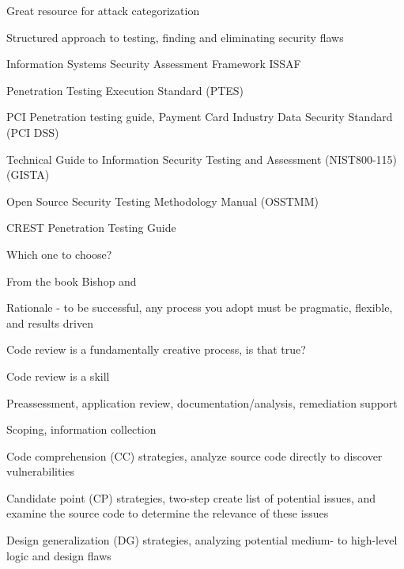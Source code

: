 \documentclass[Screen16to9,17pt]{foils}
\begin{document}

Great resource for attack categorization




\begin{list2}
\item Structured approach to testing, finding and eliminating security flaws
\item Information Systems Security Assessment Framework ISSAF
\item Penetration Testing Execution Standard (PTES)
\item PCI Penetration testing guide, Payment Card Industry Data Security Standard (PCI DSS)
\item Technical Guide to Information Security Testing and Assessment (NIST800-115) (GISTA)
\item Open Source Security Testing Methodology Manual (OSSTMM)
\item CREST Penetration Testing Guide
\end{list2}

Which one to choose?

From the book Bishop and 





\begin{list2}
\item Rationale - to be successful, any process you adopt must be pragmatic, flexible, and results driven
\item Code review is a fundamentally creative process, is that true?
\item Code review is a skill
\item Preassessment, application review, documentation/analysis, remediation support
\item Scoping, information collection
\end{list2}


\begin{list2}
\item Code comprehension (CC) strategies, analyze source code directly to discover vulnerabilities
\item Candidate point (CP) strategies, two-step create list of potential issues, and examine the source code to determine the relevance of these issues
\item Design generalization (DG) strategies, analyzing potential medium- to high-level logic and design flaws
\end{list2}
\end{document}
